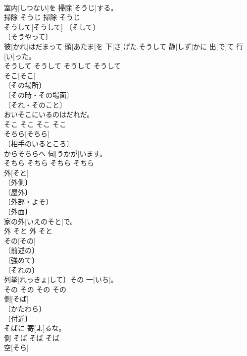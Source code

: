\documentclass[8pt]{extreport}
\begin{document}
\begin{CJK}{UTF8}{min}
\\	室内[しつない]を 掃除[そうじ]する。	
\\	掃除	そうじ	掃除	そうじ	
\\	そうして[そうして]	〔そして〕 
\\	〔そうやって〕 
\\	[⇒そして]	彼[かれ]はだまって 頭[あたま]を 下[さ]げた.そうして 静[しず]かに 出[で]て 行[い]った。	
\\	そうして	そうして	そうして	そうして	
\\	そこ[そこ]	
\\	〔その場所〕 
\\	〔その時・その場面〕 
\\	〔それ・そのこと〕 
\\	おいそこにいるのはだれだ。	
\\	そこ	そこ	そこ	そこ	
\\	そちら[そちら]	
\\	〔相手のいるところ〕 
\\	[⇒そっち 
\\	〔相手側の方向〕 
\\	〔相手の近く(にある物)〕 
\\	〔あなた〕 
\\	〔あなたの側〕 
\\	〔その方〕 
\\	今[いま]からそちらへ 伺[うかが]います。	
\\	そちら	そちら	そちら	そちら	
\\	外[そと]	
\\	〔外側〕 
\\	〔屋外〕 
\\	〔外部・よそ〕 
\\	〔外面〕 
\\	家の外[いえのそと]で。	
\\	外	そと	外	そと	
\\	その[その]	
\\	〔前述の〕 
\\	〔強めて〕 
\\	〔それの〕 
\\	列挙[れっきょ]して〕その 一[いち]。	
\\	その	その	その	その	
\\	側[そば]	
\\	〔かたわら〕 
\\	〔付近〕 
\\	そばに 寄[よ]るな。	
\\	側	そば	そば	そば	
\\	空[そら]	

\end{CJK}
\end{document}
